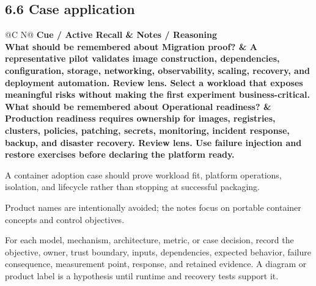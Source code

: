 \documentclass[11pt]{article}
\newcommand{\CornellHeader}{\rowcolor{Navy}\color{white}\bfseries Cue / Active Recall & \color{white}\bfseries Notes / Reasoning \\\endhead}
\newcommand{\CornellRow}[2]{\cellcolor{CueGray}\textbf{#1} & #2 \\\addlinespace[3pt]}
\begin{document}
\subsection{6.6 Case application}
\begin{longtable}{@{}C N@{}}
\CornellHeader
\CornellRow{What should be remembered about Migration proof?}{A representative pilot validates image construction, dependencies, configuration, storage, networking, observability, scaling, recovery, and deployment automation. \textbf{Review lens.} Select a workload that exposes meaningful risks without making the first experiment business-critical.}
\CornellRow{What should be remembered about Operational readiness?}{Production readiness requires ownership for images, registries, clusters, policies, patching, secrets, monitoring, incident response, backup, and disaster recovery. \textbf{Review lens.} Use failure injection and restore exercises before declaring the platform ready.}
\end{longtable}
\begin{sectionsummarybox}
A container adoption case should prove workload fit, platform operations, isolation, and lifecycle rather than stopping at successful packaging.
\end{sectionsummarybox}
\begin{scopenotebox}
Product names are intentionally avoided; the notes focus on portable container concepts and control objectives.
\end{scopenotebox}
\begin{practicebox}
For each model, mechanism, architecture, metric, or case decision, record the objective, owner, trust boundary, inputs, dependencies, expected behavior, failure consequence, measurement point, response, and retained evidence. A diagram or product label is a hypothesis until runtime and recovery tests support it.
\end{practicebox}
\end{document}
